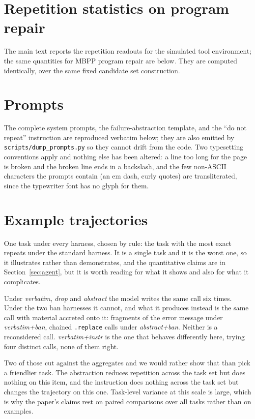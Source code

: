 

\section{Repetition statistics on program repair}
\label{app:repeat-code}

The main text reports the repetition readouts for the simulated tool
environment; the same quantities for MBPP program repair are below. They are
computed identically, over the same fixed candidate set construction.



\section{Prompts}
\label{app:prompts}

The complete system prompts, the failure-abstraction template, and the
``do not repeat'' instruction are reproduced verbatim below; they are also
emitted by \texttt{scripts/dump\_prompts.py} so they cannot drift from the code.
Two typesetting conventions apply and nothing else has been altered: a line too
long for the page is broken and the broken line ends in a backslash, and the
few non-ASCII characters the prompts contain (an em dash, curly quotes) are
transliterated, since the typewriter font has no glyph for them.



\section{Example trajectories}
\label{app:trajectories}

One task under every harness, chosen by rule: the task with the most exact
repeats under the standard harness. It is a single task and it is the worst
one, so it illustrates rather than demonstrates, and the quantitative claims are in
Section~\ref{sec:agent}, but it is worth reading for what it shows and
also for what it complicates.

Under \emph{verbatim}, \emph{drop} and \emph{abstract} the model writes the
same call six times. Under the two ban harnesses it cannot, and what it
produces instead is the same call with material accreted onto it: fragments of
the error message under \emph{verbatim+ban}, chained
\texttt{.replace} calls under \emph{abstract+ban}. Neither is a reconsidered
call. \emph{verbatim+instr} is the one that behaves differently here, trying
four distinct calls, none of them right.

Two of those cut against the aggregates and we would rather show that than
pick a friendlier task. The abstraction reduces repetition across the task set
but does nothing on this item, and the instruction does nothing across the task
set but changes the trajectory on this one. Task-level variance at this scale
is large, which is why the paper's claims rest on paired comparisons over all
tasks rather than on examples.


